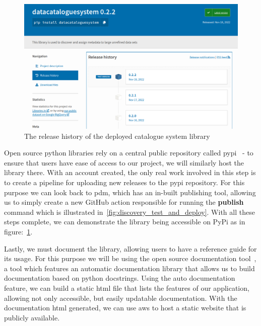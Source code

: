 \begin{figure}[H]
    \centering
    \includegraphics[width=12cm]{figures/discovery_library/pypi_catalogue_upload}
    \caption{The release history of the deployed catalogue system library}
    \label{fig:discovery_pypi_upload}
\end{figure}

Open source python libraries rely on a central public repository called pypi~\cite{pypi} - to ensure that users have
ease of access to our project, we will similarly host the library there.
With an account created, the only real work involved in this step is to create a pipeline for uploading new releases to
the pypi repository.
For this purpose we can look back to pdm, which has an in-built publishing tool, allowing us to simply create a new
GitHub action responsible for running the \textbf{publish} command which is illustrated
in~\ref{fig:discovery_test_and_deploy}.
With all these steps complete, we can demonstrate the library being accessible on PyPi as in
figure:~\ref{fig:discovery_pypi_upload}.

Lastly, we must document the library, allowing users to have a reference guide for its usage.
For this purpose we will be using the open source documentation tool~\cite{sphinx}, a tool which features an automatic
documentation library that allows us to build documentation based on python docstrings.
Using the auto documentation feature, we can build a static html file that lists the features of our application,
allowing not only accessible, but easily updatable documentation.
With the documentation html generated, we can use aws to host a static website that is publicly available.

